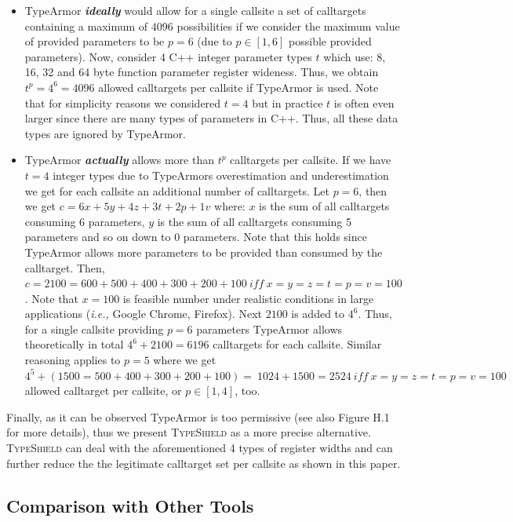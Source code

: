 \begin{itemize}
\item TypeArmor \textbf{\textit{ideally}} would allow for a single callsite a set of calltargets containing a maximum of $4096$ possibilities if we 
consider the maximum value of provided parameters to be $p=6$ (due to $p \in [1, 6]$ possible provided parameters). Now, consider 4 C++ integer parameter
types $t$ which use: 8, 16, 32 and 64 byte function parameter register wideness. Thus, we obtain $t^{p}=4^{6}=4096$ allowed calltargets per 
callsite if TypeArmor is used. Note that for simplicity reasons we considered $t=4$ but in practice $t$ is often even larger since there are many types
of parameters in C++. Thus, all these data types are ignored by TypeArmor.

\item TypeArmor \textbf{\textit{actually}} allows more than $t^{p}$ calltargets per callsite. If we have $t=4$ integer types due to TypeArmors overestimation
and underestimation we get for each callsite an additional number of calltargets. Let $p=6$, then we get $c = 6x + 5y+ 4z + 3t + 2p + 1v$ where:
$x$ is the sum of all calltargets consuming 6 parameters, 
$y$ is the sum of all calltargets consuming 5 parameters 
and so on down to 0 parameters. Note that this holds since TypeArmor allows more parameters to be provided than consumed by the calltarget.
Then, $c = 2100 = 600 + 500 + 400 + 300 + 200 + 100 \ iff \ x = y = z = t = p = v = 100$. 
Note that $x = 100$ is feasible number under realistic conditions in large applications (\textit{i.e.,} Google Chrome, Firefox). 
Next $2100$ is added to $4^{6}$. Thus, for a single callsite providing $p=6$ parameters TypeArmor allows theoretically in 
total $4^{6} + 2100 = 6196$ calltargets for each callsite.
Similar reasoning applies to $p=5$ where we get $4^{5} + (1500 = 500 + 400 + 300 + 200 + 100) = \ 1024 + 1500 = 2524 \ iff \ x=y=z=t=p=v=100$ 
allowed calltarget per callsite, or $p \in [1, 4]$, too.
\end{itemize}

Finally, as it can be observed TypeArmor is too permissive (see also Figure H.1~\cite{vci:asiaccs} for more details), thus we present \textsc{TypeShield}
as a more precise alternative. \textsc{TypeShield} can deal with the aforementioned 4 types of register widths and can further reduce the the legitimate
calltarget set per callsite as shown in this paper.

\subsection{Comparison with Other Tools}
\label{RQ5: Is TypeShield better than other tools?}

